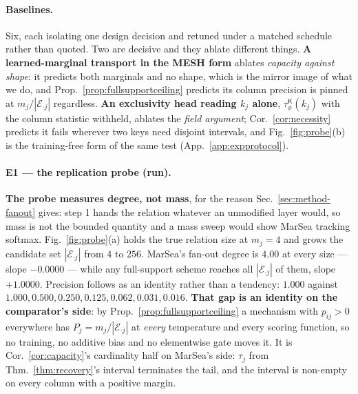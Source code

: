 \documentclass{article}
\newcommand{\tauK}{\tau^{\mathsf{K}}_\phi}
\begin{document}
\paragraph{Baselines.} Six, each isolating one design decision and retuned under a matched
schedule rather than quoted. Two are decisive and they ablate different things.
\textbf{A learned-marginal transport in the MESH form} ablates \emph{capacity against shape}: it
predicts both marginals and no shape, which is the mirror image of what we do, and
Prop.~\ref{prop:fullsupportceiling} predicts its column precision is pinned at
$m_j/|\mathcal{E}_{\cdot j}|$ regardless. \textbf{An exclusivity head reading $k_j$ alone},
$\tauK(k_j)$ with the column statistic withheld, ablates the \emph{field argument};
Cor.~\ref{cor:necessity} predicts it fails wherever two keys need disjoint intervals, and
Fig.~\ref{fig:probe}(b) is the training-free form of the same test
(App.~\ref{app:expprotocol}).

\paragraph{E1 --- the replication probe (run).} \textbf{The probe measures degree, not mass},
for the reason Sec.~\ref{sec:method-fanout} gives: step 1 hands the relation whatever an
unmodified layer would, so mass is not the bounded quantity and a mass sweep would show MarSea
tracking softmax. Fig.~\ref{fig:probe}(a) holds the true relation size at $m_j=4$ and grows the
candidate set $|\mathcal{E}_{\cdot j}|$ from $4$ to $256$. MarSea's fan-out degree is
$4.00$ at every size --- slope $-0.0000$ --- while any full-support scheme reaches all
$|\mathcal{E}_{\cdot j}|$ of them, slope $+1.0000$. Precision follows as an identity rather than
a tendency: $1.000$ against $1.000, 0.500, 0.250, 0.125, 0.062, 0.031, 0.016$. \textbf{That gap is an identity on the comparator's side}: by
Prop.~\ref{prop:fullsupportceiling} a mechanism with $p_{ij}>0$ everywhere has
$P_j = m_j/|\mathcal{E}_{\cdot j}|$ at \emph{every} temperature and every scoring function, so no
training, no additive bias and no elementwise gate moves it. It is Cor.~\ref{cor:capacity}'s
cardinality half on MarSea's side: $\tau_j$ from Thm.~\ref{thm:recovery}'s interval terminates the
tail, and the interval is non-empty on every column with a positive margin.
\end{document}
